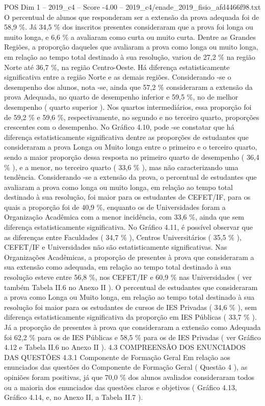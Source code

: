 \begin{textsample}{POS Dim 1 – 2019\_c4 – Score -4.00 – 2019\_c4/enade\_2019\_fisio\_afd4466f98.txt}
O percentual de alunos que responderam ser a extensão da prova adequada foi de 58,9 \%.
Já 34,5 \% dos inscritos presentes consideraram que a prova foi longa ou muito longa, e 6,6 \% a avaliaram como curta ou muito curta.
Dentre as Grandes Regiões, a proporção daqueles que avaliaram a prova como longa ou muito longa, em relação ao tempo total destinado à sua resolução, variou de 27,2 \% na região Norte até 36,7 \%, na região Centro-Oeste.
Há diferença estatisticamente significativa entre a região Norte e as demais regiões.
Considerando -se o desempenho dos alunos, nota -se, ainda que 57,2 \% consideraram a extensão da prova Adequada, no quarto de desempenho inferior e 59,5 \%, no de melhor desempenho ( quarto superior ).
Nos quartos intermediários, essa proporção foi de 59,2 \% e 59,6 \%, respectivamente, no segundo e no terceiro quarto, proporções crescentes com o desempenho.
No Gráfico 4.10, pode -se constatar que há diferença estatisticamente significativa dentre as proporções de estudantes que consideraram a prova Longa ou Muito longa entre o primeiro e o terceiro quarto, sendo a maior proporção dessa resposta no primeiro quarto de desempenho ( 36,4 \% ), e a menor, no terceiro quarto ( 33,6 \% ), mas não caracterizando uma tendência.
Considerando -se a extensão da prova, o percentual de estudantes que avaliaram a prova como longa ou muito longa, em relação ao tempo total destinado à sua resolução, foi maior para os estudantes de CEFET/IF, para os quais a proporção foi de 40,9 \%, enquanto os de Universidades foram a Organização Acadêmica com a menor incidência, com 33,6 \%, ainda que sem diferença estatisticamente significativa.
No Gráfico 4.11, é possível observar que as diferenças entre Faculdades ( 34,7 \% ), Centros Universitários ( 35,5 \% ), CEFET/IF e Universidades não são estatisticamente significativas.
Nas Organizações Acadêmicas, a proporção de presentes à prova que consideraram a sua extensão como adequada, em relação ao tempo total destinado à sua resolução esteve entre 56,8 \%, nos CEFET/IF e 60,9 \% nas Universidades ( ver também Tabela II.6 no Anexo II ).
O percentual de estudantes que consideraram a prova como Longa ou Muito longa, em relação ao tempo total destinado à sua resolução foi maior para os estudantes de cursos de IES Privadas ( 34,6 \% ), sem diferença estatisticamente significativa da proporção em IES Públicas ( 33,7 \% ).
Já a proporção de presentes à prova que consideraram a extensão como Adequada foi 62,2 \% para os de IES Públicas e 58,5 \% para os de IES Privadas ( ver Gráfico 4.12 e Tabela II.6 no Anexo II ). 4.3 COMPREENSÃO DOS ENUNCIADOS DAS QUESTÕES 4.3.1 Componente de Formação Geral Em relação aos enunciados das questões do Componente de Formação Geral ( Questão 4 ), as opiniões foram positivas, já que 70,0 \% dos alunos avaliados consideraram todos ou a maioria dos enunciados das questões claros e objetivos ( Gráfico 4.13, Gráfico 4.14, e, no Anexo II, a Tabela II.7 ).

\end{textsample}
